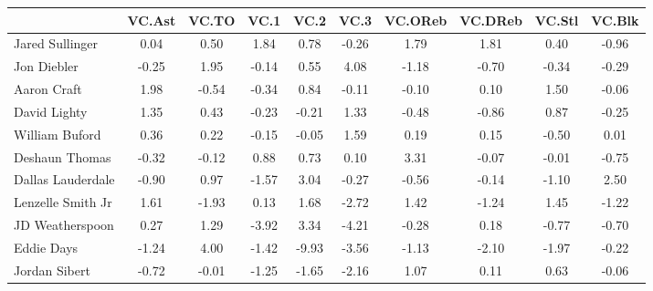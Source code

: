 \documentclass[10pt,letterpaper]{article}
\begin{document}
\begin{table}[ht]
\begin{center}
\begin{tabular}{lccccccccc}
  \hline
 & VC.Ast & VC.TO & VC.1 & VC.2 & VC.3 & VC.OReb & VC.DReb & VC.Stl & VC.Blk \\ 
  \hline
Jared Sullinger & 0.04 & 0.50 & 1.84 & 0.78 & -0.26 & 1.79 & 1.81 & 0.40 & -0.96 \\ 
  Jon Diebler & -0.25 & 1.95 & -0.14 & 0.55 & 4.08 & -1.18 & -0.70 & -0.34 & -0.29 \\ 
  Aaron Craft & 1.98 & -0.54 & -0.34 & 0.84 & -0.11 & -0.10 & 0.10 & 1.50 & -0.06 \\ 
  David Lighty & 1.35 & 0.43 & -0.23 & -0.21 & 1.33 & -0.48 & -0.86 & 0.87 & -0.25 \\ 
  William Buford & 0.36 & 0.22 & -0.15 & -0.05 & 1.59 & 0.19 & 0.15 & -0.50 & 0.01 \\ 
  Deshaun Thomas & -0.32 & -0.12 & 0.88 & 0.73 & 0.10 & 3.31 & -0.07 & -0.01 & -0.75 \\ 
  Dallas Lauderdale & -0.90 & 0.97 & -1.57 & 3.04 & -0.27 & -0.56 & -0.14 & -1.10 & 2.50 \\ 
  Lenzelle Smith Jr & 1.61 & -1.93 & 0.13 & 1.68 & -2.72 & 1.42 & -1.24 & 1.45 & -1.22 \\ 
  JD Weatherspoon & 0.27 & 1.29 & -3.92 & 3.34 & -4.21 & -0.28 & 0.18 & -0.77 & -0.70 \\ 
  Eddie Days & -1.24 & 4.00 & -1.42 & -9.93 & -3.56 & -1.13 & -2.10 & -1.97 & -0.22 \\ 
  Jordan Sibert & -0.72 & -0.01 & -1.25 & -1.65 & -2.16 & 1.07 & 0.11 & 0.63 & -0.06 \\ 
   \hline
\end{tabular}
\end{center}
\end{table}
\end{document}
